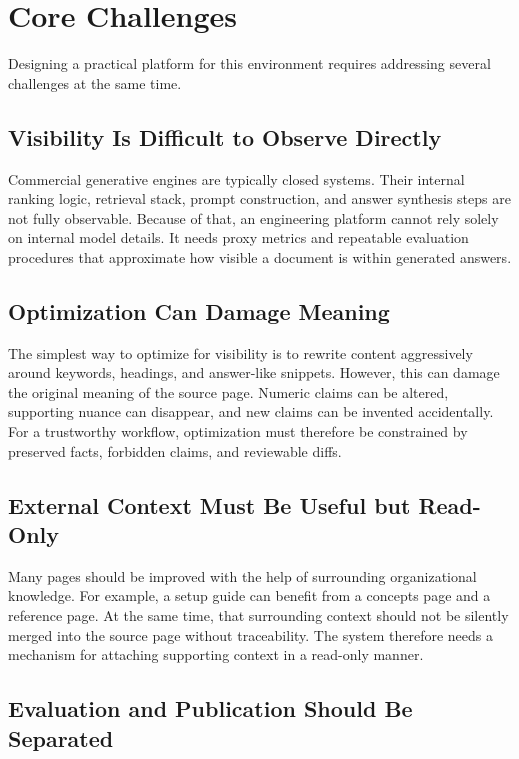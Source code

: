 \section{Core Challenges}

Designing a practical platform for this environment requires addressing several challenges at the
same time.

\subsection{Visibility Is Difficult to Observe Directly}

Commercial generative engines are typically closed systems. Their internal ranking logic,
retrieval stack, prompt construction, and answer synthesis steps are not fully observable.
Because of that, an engineering platform cannot rely solely on internal model details. It needs
proxy metrics and repeatable evaluation procedures that approximate how visible a document is
within generated answers.

\subsection{Optimization Can Damage Meaning}

The simplest way to optimize for visibility is to rewrite content aggressively around keywords,
headings, and answer-like snippets. However, this can damage the original meaning of the
source page. Numeric claims can be altered, supporting nuance can disappear, and new claims
can be invented accidentally. For a trustworthy workflow, optimization must therefore be
constrained by preserved facts, forbidden claims, and reviewable diffs.

\subsection{External Context Must Be Useful but Read-Only}

Many pages should be improved with the help of surrounding organizational knowledge. For
example, a setup guide can benefit from a concepts page and a reference page. At the same
time, that surrounding context should not be silently merged into the source page without
traceability. The system therefore needs a mechanism for attaching supporting context in a
read-only manner.

\subsection{Evaluation and Publication Should Be Separated}

